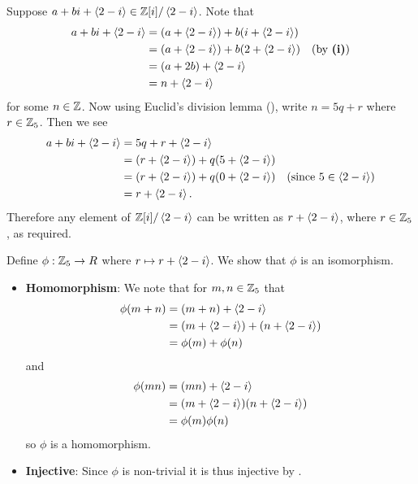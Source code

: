\begin{questions}
\begin{partquestions}{\roman*}
        \item Suppose $a + bi + \left\langle2-i\right\rangle \in \mathbb{Z}[i]/\left\langle2-i\right\rangle$. Note that
        \begin{align*}
            a + bi + \left\langle2-i\right\rangle &= (a+\left\langle2-i\right\rangle) + b(i + \left\langle2-i\right\rangle)\\
            &= (a+\left\langle2-i\right\rangle) + b(2 + \left\langle2-i\right\rangle) & (\text{by }\textbf{(i)})\\
            &= (a + 2b) + \left\langle2-i\right\rangle\\
            &= n + \left\langle2-i\right\rangle
        \end{align*}
        for some $n \in \mathbb{Z}$. Now using Euclid's division lemma (), write $n = 5q + r$ where $r \in \mathbb{Z}_5$. Then we see
        \begin{align*}
            a + bi + \left\langle2-i\right\rangle &= 5q + r + \left\langle2-i\right\rangle\\
            &= (r + \left\langle2-i\right\rangle) + q(5 + \left\langle2-i\right\rangle)\\
            &= (r + \left\langle2-i\right\rangle) + q(0 + \left\langle2-i\right\rangle) & (\text{since } 5 \in \left\langle2-i\right\rangle)\\
            &= r + \left\langle2-i\right\rangle.
        \end{align*}
        Therefore any element of $\mathbb{Z}[i]/\left\langle2-i\right\rangle$ can be written as $r + \left\langle2-i\right\rangle$, where $r \in \mathbb{Z}_5$, as required.

        \item Define $\phi: \mathbb{Z}_5 \to R$ where $r \mapsto r + \left\langle2-i\right\rangle$. We show that $\phi$ is an isomorphism.
        \begin{itemize}
            \item \textbf{Homomorphism}: We note that for $m,n \in \mathbb{Z}_5$ that
            \begin{align*}
                \phi(m+n) &= (m+n) + \left\langle2-i\right\rangle\\
                &= (m + \left\langle2-i\right\rangle) + (n + \left\langle2-i\right\rangle)\\
                &= \phi(m) + \phi(n)
            \end{align*}
            and
            \begin{align*}
                \phi(mn) &= (mn) + \left\langle2-i\right\rangle\\
                &= (m + \left\langle2-i\right\rangle)(n + \left\langle2-i\right\rangle)\\
                &= \phi(m)\phi(n)
            \end{align*}
            so $\phi$ is a homomorphism.

            \item \textbf{Injective}: Since $\phi$ is non-trivial it is thus injective by .


\end{itemize}
\end{partquestions}
\end{questions}
